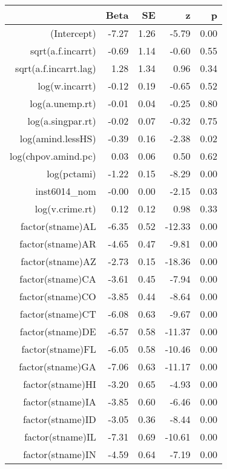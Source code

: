 \begin{table}[ht]
\centering
\begin{tabular}{rrrrr}
  \hline
 & Beta & SE & z & p \\ 
  \hline
(Intercept) & -7.27 & 1.26 & -5.79 & 0.00 \\ 
  sqrt(a.f.incarrt) & -0.69 & 1.14 & -0.60 & 0.55 \\ 
  sqrt(a.f.incarrt.lag) & 1.28 & 1.34 & 0.96 & 0.34 \\ 
  log(w.incarrt) & -0.12 & 0.19 & -0.65 & 0.52 \\ 
  log(a.unemp.rt) & -0.01 & 0.04 & -0.25 & 0.80 \\ 
  log(a.singpar.rt) & -0.02 & 0.07 & -0.32 & 0.75 \\ 
  log(amind.lessHS) & -0.39 & 0.16 & -2.38 & 0.02 \\ 
  log(chpov.amind.pc) & 0.03 & 0.06 & 0.50 & 0.62 \\ 
  log(pctami) & -1.22 & 0.15 & -8.29 & 0.00 \\ 
  inst6014\_nom & -0.00 & 0.00 & -2.15 & 0.03 \\ 
  log(v.crime.rt) & 0.12 & 0.12 & 0.98 & 0.33 \\ 
  factor(stname)AL & -6.35 & 0.52 & -12.33 & 0.00 \\ 
  factor(stname)AR & -4.65 & 0.47 & -9.81 & 0.00 \\ 
  factor(stname)AZ & -2.73 & 0.15 & -18.36 & 0.00 \\ 
  factor(stname)CA & -3.61 & 0.45 & -7.94 & 0.00 \\ 
  factor(stname)CO & -3.85 & 0.44 & -8.64 & 0.00 \\ 
  factor(stname)CT & -6.08 & 0.63 & -9.67 & 0.00 \\ 
  factor(stname)DE & -6.57 & 0.58 & -11.37 & 0.00 \\ 
  factor(stname)FL & -6.05 & 0.58 & -10.46 & 0.00 \\ 
  factor(stname)GA & -7.06 & 0.63 & -11.17 & 0.00 \\ 
  factor(stname)HI & -3.20 & 0.65 & -4.93 & 0.00 \\ 
  factor(stname)IA & -3.85 & 0.60 & -6.46 & 0.00 \\ 
  factor(stname)ID & -3.05 & 0.36 & -8.44 & 0.00 \\ 
  factor(stname)IL & -7.31 & 0.69 & -10.61 & 0.00 \\ 
  factor(stname)IN & -4.59 & 0.64 & -7.19 & 0.00 \\ 

\end{tabular}
\end{table}
